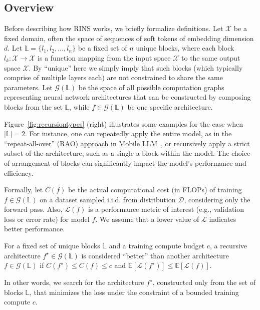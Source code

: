 \subsection{Overview}
Before describing how RINS works, we briefly formalize definitions. Let $\mathcal{X}$ be a fixed domain, often the space of sequences of soft tokens of embedding dimension $d$. Let $\mathbb{L} = \{l_1, l_2, ..., l_n\}$ be a fixed set of $n$ unique blocks, where each block  $l_k: \mathcal{X} \to \mathcal{X}$ is a function mapping from the input space $\mathcal{X}$ to the same output space $\mathcal{X}$. By ``unique'' here we simply imply that such blocks (which  typically comprise of multiple layers each) are not constrained to share the same parameters. Let $\mathcal{G}(\mathbb{L})$ be the space of all possible computation graphs representing neural network architectures that can be constructed by composing blocks from the set $\mathbb{L}$, while $f \in \mathcal{G}(\mathbb{L})$ be one specific architecture. 

Figure~\ref{fig:recursiontypes} (right) illustrates some examples for the case when $|\mathbb{L}|=2$. For instance, one can repeatedly apply the entire model, as in the ``repeat-all-over'' (RAO) approach in Mobile LLM~\cite{liu2024mobilellm}, or recursively apply a strict subset of the architecture, such as a single a block within the model. The choice of arrangement of blocks can significantly impact the model's performance and efficiency.

Formally, let $C(f)$ be the actual computational cost (in FLOPs) of training $f \in \mathcal{G}(\mathbb{L})$ on a dataset sampled i.i.d. from  distribution $\mathcal{D}$, considering only the forward pass. Also, $\mathcal{L}(f)$ is a performance metric of interest (e.g., validation loss or error rate) for model $f$. We assume that a lower value of $\mathcal{L}$ indicates better performance. 
\begin{definition}\label{def:rec}
For a fixed set of unique blocks $\mathbb{L}$ and a training compute budget $c$, a recursive architecture $f^\star \in \mathcal{G}(\mathbb{L})$ is considered ``better'' than another architecture $f \in \mathcal{G}(\mathbb{L})$ if  $C(f^\star)\le C(f)\le c$ and  $\mathbb{E}[\mathcal{L}(f^\star)] \le  \mathbb{E}[\mathcal{L}(f)]$.
\end{definition}
In other words, we search for the architecture $f^\star$, constructed only from the set of blocks $\mathbb{L}$, that minimizes the loss under the constraint of a bounded training compute $c$.

